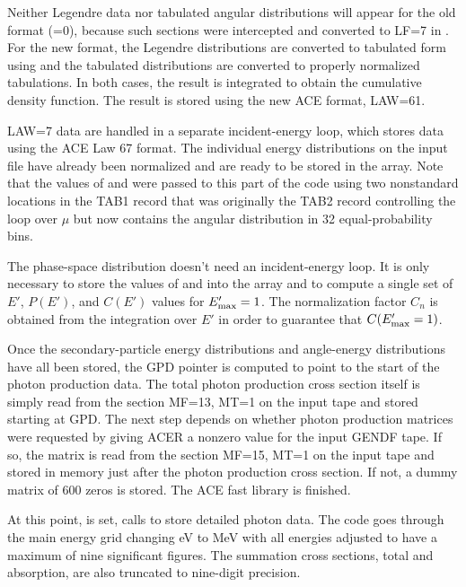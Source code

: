Neither Legendre data nor tabulated angular distributions will
appear for the old format (=0), because such sections
were intercepted and converted to LF=7 in
.  For the
new format, the Legendre distributions are converted to tabulated
form using  and the
tabulated distributions are converted to properly normalized
tabulations.  In both cases, the result is integrated to obtain
the cumulative density function.  The result is stored using
the new ACE format, LAW=61.

LAW=7 data are handled in a separate incident-energy loop, which
stores data using the ACE Law 67 format.  The individual energy
distributions on the input file have already been normalized and
are ready to be stored in the  array.  Note that the
values of  and  were passed to this part
of the code using two nonstandard locations in the TAB1 record
that was originally the TAB2 record controlling the loop over
$\mu$ but now contains the angular distribution in 32
equal-probability bins.

The phase-space distribution doesn't need an incident-energy loop.
It is only necessary to store the values of 
and  into the  array and to compute a
single set of $E'$, $P(E')$, and $C(E')$ values for
$E'_{\rm max}=1$.  The normalization factor $C_n$ is obtained
from the integration over $E'$ in order to guarantee that
$C(E'_{\rm max}=1)$.

Once the secondary-particle energy distributions and angle-energy
distributions have all been stored, the GPD pointer is computed
to point to the start of the photon production data.  The total
photon production cross section itself is simply read from the
section MF=13, MT=1 on the input tape and stored starting at GPD.
The next step depends on whether photon production matrices were
requested by giving ACER a nonzero value for the input GENDF tape.
If so, the matrix is read from the section MF=15, MT=1 on the input
tape and stored in memory just after the photon production cross
section.  If not, a dummy matrix of 600 zeros is stored.  The ACE
fast library is finished.

At this point,  is set,  calls
 to store detailed photon data.
The code goes through the main energy grid changing eV to MeV
with all energies adjusted to have a maximum of nine
significant figures.  The summation cross sections, total
and absorption, are also truncated to nine-digit precision.

